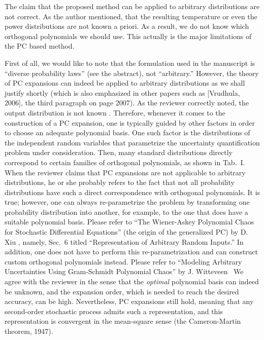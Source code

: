 \begin{reviewer}
The claim that the proposed method can be applied to arbitrary distributions are not correct. As the author mentioned, that the resulting temperature or even the power distributions are not known a priori. As a result, we do not know which orthogonal polynomials we should use. This actually is the major limitations of the PC based method.
\end{reviewer}
\begin{authors}
First of all, we would like to note that the formulation used in the manuscript is ``diverse probability laws'' (see the abstract), not ``arbitrary.''
However, the theory of PC expansions can indeed be applied to arbitrary distributions as we shall justify shortly (which is also emphasized in other papers such as [Vrudhula, 2006], the third paragraph on page 2007).
As the reviewer correctly noted, the output distribution is not known \apriori.
Therefore, whenever it comes to the construction of a PC expansion, one is typically guided by other factors in order to choose an adequate polynomial basis.
One such factor is the distributions of the independent random variables that parametrize the uncertainty quantification problem under consideration.
Then, many standard distributions directly correspond to certain families of orthogonal polynomials, as shown in Tab.~I.
When the reviewer claims that PC expansions are not applicable to arbitrary distributions, he or she probably refers to the fact that not all probability distributions have such a direct correspondence with orthogonal polynomials.
It is true; however, one can always re-parametrize the problem by transforming one probability distribution into another, for example, to the one that does have a suitable polynomial basis.
Please refer to ``The Wiener-Askey Polynomial Chaos for Stochastic Differential Equations'' (the origin of the generalized PC) by D. Xiu \etal, namely, Sec.~6 titled ``Representation of Arbitrary Random Inputs.''
In addition, one does not have to perform this re-parametrization and can construct custom orthogonal polynomials instead.
Please refer to ``Modeling Arbitrary Uncertainties Using Gram-Schmidt Polynomial Chaos'' by J. Witteveen \etal\ We agree with the reviewer in the sense that the \emph{optimal} polynomial basis can indeed be unknown, and the expansion order, which is needed to reach the desired accuracy, can be high.
Nevertheless, PC expansions still hold, meaning that any second-order stochastic process admits such a representation, and this representation is convergent in the mean-square sense (the Cameron-Martin theorem, 1947).
\end{authors}

